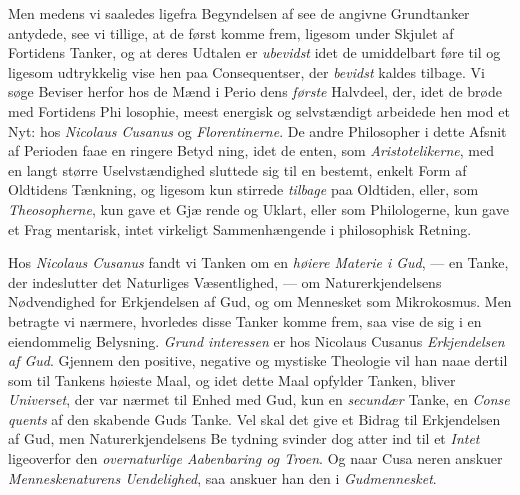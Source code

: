 Men medens vi saaledes ligefra Begyndelsen af see de
angivne Grundtanker antydede, see vi tillige, at de først
komme frem, ligesom under Skjulet af Fortidens Tanker, og
at deres Udtalen er \emph{ubevidst} idet de umiddelbart føre til og
ligesom udtrykkelig vise hen paa Consequentser, der \emph{bevidst}
kaldes tilbage. Vi søge Beviser herfor hos de Mænd i Perio\-%
dens \emph{første} Halvdeel, der, idet de brøde med Fortidens Phi\-%
losophie, meest energisk og selvstændigt arbeidede hen mod et
Nyt: hos \emph{Nicolaus Cusanus} og \emph{Florentinerne}. De andre
Philosopher i dette Afsnit af Perioden faae en ringere Betyd\-%
ning, idet de enten, som \emph{Aristotelikerne}, med en langt
større Uselvstændighed sluttede sig til en bestemt, enkelt
Form af Oldtidens Tænkning, og ligesom kun stirrede \emph{tilbage}
paa Oldtiden, eller, som \emph{Theosopherne}, kun gave et Gjæ\-%
\setcounter{footnote}{0}%
rende og Uklart, eller som Philologerne, kun gave et Frag\-%
mentarisk, intet virkeligt Sammenhængende i philosophisk
Retning.

Hos \emph{Nicolaus Cusanus} fandt vi Tanken om en \emph{høiere
Materie i Gud}, --- en Tanke, der indeslutter det Naturliges
Væsentlighed, --- om Naturerkjendelsens Nødvendighed for
Erkjendelsen af Gud, og om Mennesket som Mikrokosmus.
Men betragte vi nærmere, hvorledes disse Tanker komme
frem, saa vise de sig i en eiendommelig Belysning. \emph{Grund\-%
interessen} er hos Nicolaus Cusanus \emph{Erkjendelsen af
Gud}. Gjennem den positive, negative og mystiske Theologie
vil han naae dertil som til Tankens høieste Maal, og idet
dette Maal opfylder Tanken, bliver \emph{Universet}, der var nærmet
til Enhed med Gud, kun en \emph{secundær} Tanke, en \emph{Conse\-%
quents} af den skabende Guds Tanke. Vel skal det give et
Bidrag til Erkjendelsen af Gud, men Naturerkjendelsens Be\-%
tydning svinder dog atter ind til et \emph{Intet} ligeoverfor den
\emph{overnaturlige Aabenbaring og Troen}. Og naar Cusa\-%
neren anskuer \emph{Menneskenaturens Uendelighed}, saa anskuer
han den i \emph{Gudmennesket}.

